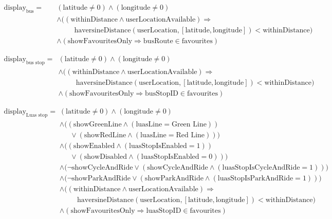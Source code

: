 \documentclass[a4paper,11pt]{report}
\begin{document}
\begin{align*}
\text{display}_{\text{bus}} =\quad
& (\text{latitude} \neq 0) \land (\text{longitude} \neq 0) \\
& \land \big( (\text{withinDistance} \land \text{userLocationAvailable}) \Rightarrow \\
& \quad\quad\ \ \text{haversineDistance}(\text{userLocation}, [\text{latitude}, \text{longitude}]) < \text{withinDistance} \big) \\
& \land \left( \text{showFavouritesOnly} \Rightarrow \text{busRoute} \in \text{favourites} \right)
\end{align*}

\begin{align*}
\text{display}_{\text{bus stop}} =\quad
& (\text{latitude} \neq 0) \land (\text{longitude} \neq 0) \\
& \land \big( (\text{withinDistance} \land \text{userLocationAvailable}) \Rightarrow \\
& \quad\quad\ \ \text{haversineDistance}(\text{userLocation}, [\text{latitude}, \text{longitude}]) < \text{withinDistance} \big) \\
& \land \left( \text{showFavouritesOnly} \Rightarrow \text{busStopID} \in \text{favourites} \right)
\end{align*}

\begin{align*}
\text{display}_{\text{Luas stop}} =\quad
& (\text{latitude} \neq 0) \land (\text{longitude} \neq 0) \\
& \land \big( (\text{showGreenLine} \land (\text{luasLine} = \text{Green Line})) \\
& \quad\ \ \lor (\text{showRedLine} \land (\text{luasLine} = \text{Red Line})) \big) \\
& \land \big( (\text{showEnabled} \land (\text{luasStopIsEnabled} = 1)) \\
& \quad\ \ \lor (\text{showDisabled} \land (\text{luasStopIsEnabled} = 0)) \big) \\
& \land \big( \neg \text{showCycleAndRide} \lor (\text{showCycleAndRide} \land (\text{luasStopIsCycleAndRide} = 1)) \big) \\
& \land \big( \neg \text{showParkAndRide} \lor (\text{showParkAndRide} \land (\text{luasStopIsParkAndRide} = 1)) \big) \\
& \land \big( (\text{withinDistance} \land \text{userLocationAvailable}) \Rightarrow \\
& \quad\quad\ \ \text{haversineDistance}(\text{userLocation}, [\text{latitude}, \text{longitude}]) < \text{withinDistance} \big) \\
& \land \left( \text{showFavouritesOnly} \Rightarrow \text{luasStopID} \in \text{favourites} \right)
\end{align*}
\end{document}
